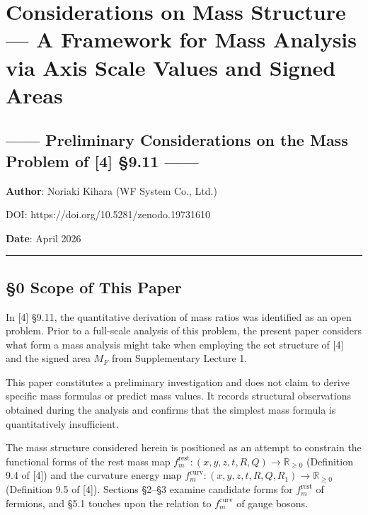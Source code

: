 \documentclass[
  a4paper,11pt]{article}
\theoremstyle{definition}
\theoremstyle{remark}
\begin{document}
\section{Considerations on Mass Structure --- A Framework for Mass
Analysis via Axis Scale Values and Signed
Areas}\label{considerations-on-mass-structure-a-framework-for-mass-analysis-via-axis-scale-values-and-signed-areas}

\subsection{------ Preliminary Considerations on the Mass Problem of
{[}4{]} §9.11
------}\label{preliminary-considerations-on-the-mass-problem-of-4-9.11}

\textbf{Author}: Noriaki Kihara (WF System Co., Ltd.)

DOI: https://doi.org/10.5281/zenodo.19731610

\textbf{Date}: April 2026

\begin{center}\rule{0.5\linewidth}{0.5pt}\end{center}

\subsection{§0 Scope of This Paper}\label{scope-of-this-paper}

In {[}4{]} §9.11, the quantitative derivation of mass ratios was
identified as an open problem. Prior to a full-scale analysis of this
problem, the present paper considers what form a mass analysis might
take when employing the set structure of {[}4{]} and the signed area
\(M_F\) from Supplementary Lecture 1.

This paper constitutes a preliminary investigation and does not claim to
derive specific mass formulas or predict mass values. It records
structural observations obtained during the analysis and confirms that
the simplest mass formula is quantitatively insufficient.

The mass structure considered herein is positioned as an attempt to
constrain the functional forms of the rest mass map
\(f_m^{\text{rest}}: (x, y, z, t, R, Q) \to \mathbb{R}_{\geq 0}\)
(Definition 9.4 of {[}4{]}) and the curvature energy map
\(f_m^{\text{curv}}: (x, y, z, t, R, Q, R_1) \to \mathbb{R}_{\geq 0}\)
(Definition 9.5 of {[}4{]}). Sections §2--§3 examine candidate forms for
\(f_m^{\text{rest}}\) of fermions, and §5.1 touches upon the relation to
\(f_m^{\text{curv}}\) of gauge bosons.
\end{document}
